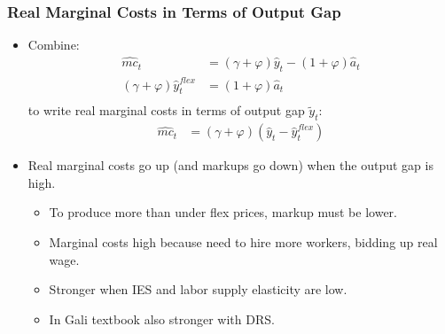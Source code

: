 \documentclass[11pt,aspectratio=169,xcolor={dvipsnames},hyperref={pdftex,pdfpagemode=UseNone,hidelinks,pdfdisplaydoctitle=true},usepdftitle=false]{beamer}
\begin{document}
%
\begin{frame}
\frametitle{Real Marginal Costs in Terms of Output Gap
}
\begin{itemize}
	\item Combine:
	\begin{align*}
		\hat{mc}_t&=(\gamma+\varphi)\hat{y}_t-(1+\varphi)\hat{a}_t \\
		(\gamma+\varphi)\hat{y}_t^{flex}&=(1+\varphi)\hat{a}_t \\
\end{align*}
	to write real marginal costs in terms of output gap $\tilde{y}_t$:
	\begin{align*}
		\hat{mc}_t&=(\gamma+\varphi)(\hat{y}_t-\hat{y}_t^{flex})
	\end{align*}
	\item Real marginal costs go up (and markups go down) when the output gap is high.
	\begin{itemize}
		\item To produce more than under flex prices, markup must be lower.
		\item Marginal costs high because need to hire more workers,
bidding up real wage.
		\item Stronger when IES and labor supply elasticity are low.
		\item In Gali textbook also stronger with DRS.
	\end{itemize}
\end{itemize}
\end{frame}
\end{document}
